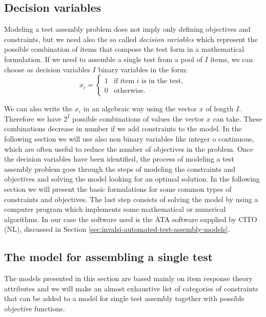 \subsection{Decision variables}

Modeling a test assembly problem does not imply only defining objectives and constraints, but we need also the so called \emph{decision variables} which represent the possible combination of items that compose the test form in a mathematical formulation. If we need to assemble a single test from a pool of $I$ items, we can choose as decision variables $I$ binary variables in the form:
\begin{equation*}\label{eq:Mmod:Mol}
x_{i}=
\begin{cases}
1 & \mbox{if item }i \mbox{ is in the test},\\


0 & \mbox{otherwise}.


\end{cases}
\end{equation*}

We can also write the $x_i$ in an algebraic way using the vector $x$ of length $I$. Therefore we have $2^I$ possible combinations of values the vector $x$ can take. These combinations decrease in number if we add constraints to the model. In the following section we will use also non binary variables like integer o continuous, which are often useful to reduce the number of objectives in the problem. Once the decision variables have been identified, the process of modeling a test assembly problem goes through the steps of modeling the constraints and objectives and solving the model looking for an optimal solution.
In the following section we will present the basic formulations for some common types of constraints and objectives. The last step consists of solving the model by using a computer program which implements some mathematical or numerical algorithms. In our case the software used is the ATA software supplied by CITO (NL), discussed in Section \ref{sec:invalsi-automated-test-assembly-models}.

\subsection{The model for assembling a single test}
The models presented in this section are based mainly on item response theory attributes and we will make an almost exhaustive list of categories of constraints that can be added to a model for single test assembly together with possible objective functions.

